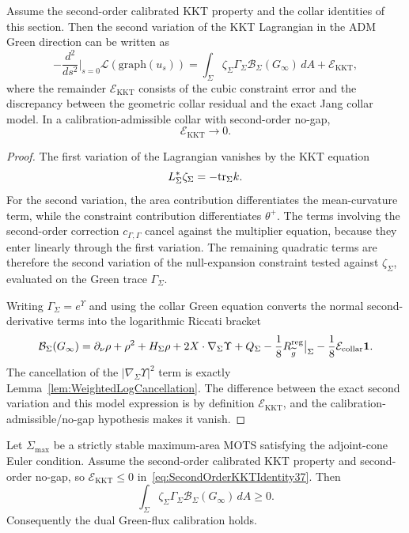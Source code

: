 \begin{lemma}\label{lem:SecondOrderKKTIdentity37}
Assume the second-order calibrated KKT property and the collar identities of this section. Then the second variation of the KKT Lagrangian in the ADM Green direction can be written as
\begin{equation}\label{eq:SecondOrderKKTIdentity37}
    -\frac{d^2}{ds^2}\bigg|_{s=0}\mathscr L(\mathrm{graph}(u_s))
    =
    \int_\Sigma
        \zeta_\Sigma\Gamma_\Sigma
        \mathcal B_\Sigma(G_\infty)\,dA
    +
    \mathcal E_{\mathrm{KKT}},
\end{equation}
where the remainder \(\mathcal E_{\mathrm{KKT}}\) consists of the cubic constraint error and the discrepancy between the geometric collar residual and the exact Jang collar model. In a calibration-admissible collar with second-order no-gap,
\[
    \mathcal E_{\mathrm{KKT}}\to0 .
\]
\end{lemma}

\begin{proof}
The first variation of the Lagrangian vanishes by the KKT equation
\[
    L_\Sigma^*\zeta_\Sigma=-\mathrm{tr}_\Sigma k .
\]
For the second variation, the area contribution differentiates the mean-curvature term, while the constraint contribution differentiates \(\theta^+\). The terms involving the second-order correction \(c_{\Gamma,\Gamma}\) cancel against the multiplier equation, because they enter linearly through the first variation. The remaining quadratic terms are therefore the second variation of the null-expansion constraint tested against \(\zeta_\Sigma\), evaluated on the Green trace \(\Gamma_\Sigma\).

Writing \(\Gamma_\Sigma=e^\Upsilon\) and using the collar Green equation converts the normal second-derivative terms into the logarithmic Riccati bracket
\[
    \mathcal B_\Sigma(G_\infty)
    =
    \partial_\nu\rho+\rho^2+H_\Sigma\rho
    +2X\cdot\nabla_\Sigma\Upsilon
    +Q_\Sigma-\frac18R_{\widetilde{g}}^{\mathrm{reg}}\big|_\Sigma
    -\frac18\mathcal E_{\mathrm{collar}}\mathbf1 .
\]
The cancellation of the \(|\nabla_\Sigma\Upsilon|^2\) term is exactly Lemma~\ref{lem:WeightedLogCancellation}. The difference between the exact second variation and this model expression is by definition \(\mathcal E_{\mathrm{KKT}}\), and the calibration-admissible/no-gap hypothesis makes it vanish.
\end{proof}

\begin{theorem}\label{thm:KKTImpliesWeightedRiccati}
Let \(\Sigma_{\max}\) be a strictly stable maximum-area MOTS satisfying the adjoint-cone Euler condition. Assume the second-order calibrated KKT property and second-order no-gap, so \(\mathcal E_{\mathrm{KKT}}\le0\) in~\eqref{eq:SecondOrderKKTIdentity37}. Then
\[
    \int_\Sigma
        \zeta_\Sigma\Gamma_\Sigma
        \mathcal B_\Sigma(G_\infty)\,dA\ge0 .
\]
Consequently the dual Green-flux calibration holds.
\end{theorem}

